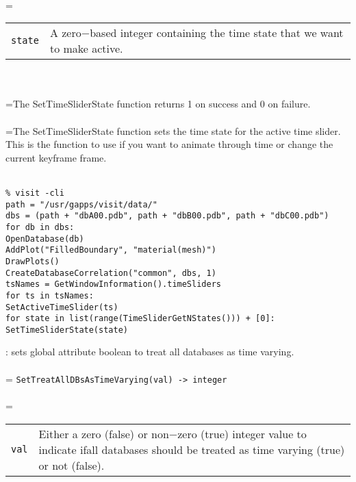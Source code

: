 \documentclass[10pt,a4paper]{report}
\begin{document}
 \\ 
\hangindent=\parindent 
\begin{tabular}{lp{9cm}}
\verb!state! & A zero$-$based integer containing the time state that we want to make active. \\
\end{tabular} \\[-2mm]


 \\ 
\hangindent=\parindent The SetTimeSliderState function returns 1 on success and 0 on failure. \\[-3mm] 

 \\ 
\hangindent=\parindent The SetTimeSliderState function sets the time state for the active time slider. This is the function to use if you want to animate through time or change the current keyframe frame. \\[-3mm] 

\\[-6mm]
\begin{verbatim}% visit -cli
path = "/usr/gapps/visit/data/"
dbs = (path + "dbA00.pdb", path + "dbB00.pdb", path + "dbC00.pdb")
for db in dbs:
OpenDatabase(db)
AddPlot("FilledBoundary", "material(mesh)")
DrawPlots()
CreateDatabaseCorrelation("common", dbs, 1)
tsNames = GetWindowInformation().timeSliders
for ts in tsNames:
SetActiveTimeSlider(ts)
for state in list(range(TimeSliderGetNStates())) + [0]:
SetTimeSliderState(state)
\end{verbatim}
\newpage


{}
: sets global attribute boolean to treat all databases as time varying.\\[-3mm]

 \\ 
\hangindent=\parindent 
\verb!SetTreatAllDBsAsTimeVarying(val) -> integer!\\ [-3mm]

 \\ 
\hangindent=\parindent 
\begin{tabular}{lp{9cm}}
\verb!val! & Either a zero (false) or non$-$zero (true) integer value to indicate ifall databases should be treated as time varying (true) or not (false). \\
\end{tabular} \\[-2mm]
\end{document}
